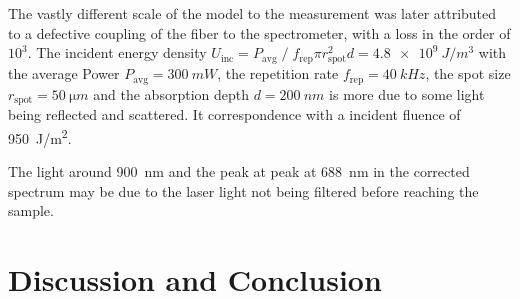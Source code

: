 \documentclass[
	a4paper,
]{scrarticle}
\begin{document}
The vastly different scale of the model to the measurement was later attributed to a defective coupling of the fiber to the spectrometer, with a loss in the order of $10^3$. 
The incident energy density $U_\text{inc} = P_\text{avg} \; / \; f_\text{rep} \pi r_\text{spot}^2 d = \SI{4.8e9}{J/m^3}$ with the average Power $P_\text{avg}=\SI{300}{mW}$, the repetition rate $f_\text{rep}=\SI{40}{kHz}$, the spot size $r_\text{spot}=\SI{50}{\micro m}$ and the absorption depth $d=\SI{200}{nm}$ \cite{smauszDeterminationUVVisible2017} is more due to some light being reflected and scattered. It correspondence with a incident fluence of \SI{950}{J/m^2}. 

The light around \SI{900}{nm} and the peak at peak at \SI{688}{nm} in the corrected spectrum may be due to the laser light not being filtered before reaching the sample.

\section{Discussion and Conclusion}

\clearpage
\printbibliography
\end{document}

